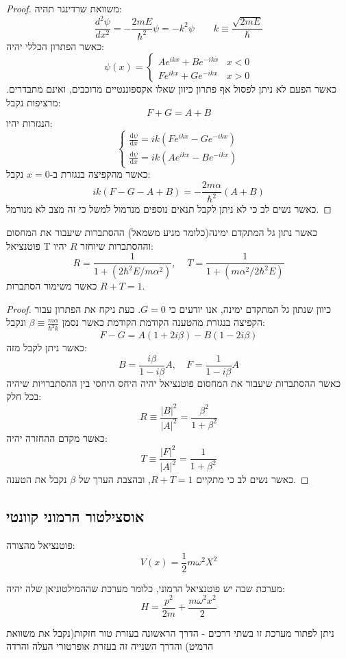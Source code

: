 \documentclass{tstextbook}
\begin{document}
\begin{proof}
משוואת שרדינגר תהיה:
$${\frac{d^{2}\psi}{d x^{2}}}=-{\frac{2m E}{\hbar^{2}}}\psi=-k^{2}\psi \qquad k\equiv{\frac{\sqrt{2m E}}{\hbar}}$$
כאשר הפתרון הכללי יהיה:
$$\psi(x)=\begin{cases}A e^{i k x}+B e^{-i k x} & x<0 \\F e^{i k x}+G e^{-i k x} & x> 0
\end{cases}$$
כאשר הפעם לא ניתן לפסול אף פתרון כיוון שאלו אקספוננטיים מרוכבים, ואינם מתבדרים. מרציפות נקבל:
$$F+G=A+B$$
הנגזרות יהיו:
$$\begin{cases}\frac{\mathrm{d} \psi}{\mathrm{d} x} =i k\left(F e^{i k x}-G e^{-i k x}\right) \\\frac{\mathrm{d} \psi}{\mathrm{d} x} =i k\left(A e^{i k x}-B e^{-i k x}\right)
\end{cases}$$
כאשר מהקפיצה בנגזרת ב-\(x=0\) נקבל:
$$ik(F-G-A+B)=-\frac{2m\alpha}{\hbar^{2}}(A+B)$$
כאשר נשים לב כי לא ניתן לקבל תנאים נוספים מנרמול למשל כי זה מצב לא מנורמל.

\end{proof}
\begin{proposition}
כאשר נתון גל המתקדם ימינה(כלומר מגיע משמאל) ההסתברות שיעבור את המחסום פוטנציאל T וההסתברות שיוחזר \(R\) יהיו:
$$R=\frac{1}{1+\left(2\hbar^{2}E/m\alpha^{2}\right)},\;\;\;\;T=\frac{1}{1+(m\alpha^{2}/2\hbar^{2}E)}$$
כאשר משימור הסתברות \(R+T=1\).

\end{proposition}
\begin{proof}
כיוון שנתון גל המתקדם ימינה, אנו יודעים כי \(G=0\). כעת ניקח את הפתרון עבור הקפיצה בנגזרת מהטענה הקודמת הקודמת כאשר נסמן \(\beta \equiv \frac{m\alpha}{\hbar^{2}k}\) ונקבל:
$$F-G=A\left(1+2i\beta\right)-B\left(1-2i\beta\right)$$
כאשר ניתן לקבל מזה:
$$B=\frac{i\beta}{1-i\beta}A,\quad F=\frac{1}{1-i\beta}A$$
כאשר ההסתברות שיעבור את המחסום פוטנציאל יהיה היחס היחסי בין ההסתברויות  שיהיה בכל חלק:
$$R\equiv\frac{|B|^{2}}{|A|^{2}}=\frac{\beta^{2}}{1+\beta^{2}}$$
כאשר מקדם ההחזרה יהיה:
$$T\equiv\frac{|F|^{2}}{|A|^{2}}=\frac{1}{1+\beta^{2}}$$
כאשר נשים לב כי מתקיים \(R+T=1\), ובהצבת הערך של \(\beta\) נקבל את הטענה.

\end{proof}
\subsection{אוסצילטור הרמוני קוונטי}

\begin{definition}
פוטנציאל מהצורה:
$$V(x)={\frac{1}{2}}m\omega^{2}X^{2}$$

\end{definition}
\begin{definition}
מערכת שבה יש פוטנציאל הרמוני, כלומר מערכת שההמילטוניאן שלה יהיה:
$$H={\frac{p^{2}}{2m}}+{\frac{m\omega^{2}x^{2}}{2}}$$

\end{definition}
ניתן לפתור מערכת זו בשתי דרכים - הדרך הראשונה בעזרת טור חזקות(נקבל את משוואת הרמיט) והדרך השנייה זה בעזרת אופרטורי העלה והרדה
\end{document}
